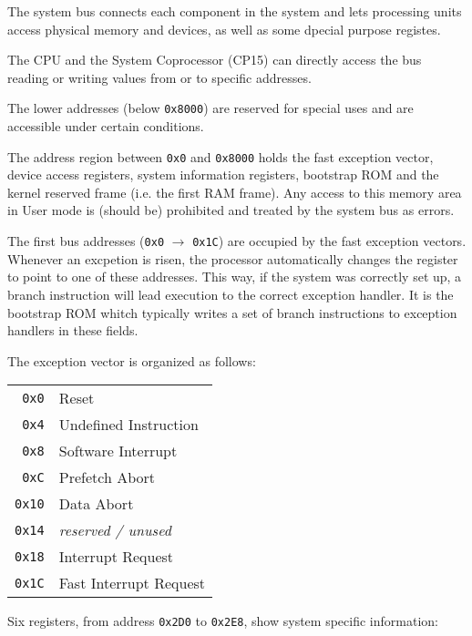 
The system bus connects each component in the system and lets processing units access physical memory and devices, as well as some dpecial purpose registes.

The CPU and the System Coprocessor (CP15) can directly access the bus reading or writing values from or to specific addresses.

The lower addresses (below \texttt{0x8000}) are reserved for special uses and are accessible under certain conditions.

The address region between \texttt{0x0} and \texttt{0x8000} holds the fast exception vector, device access registers, system information registers, bootstrap ROM and the kernel reserved frame (i.e. the first RAM frame). Any access to this memory area in User mode is (should be) prohibited and treated by the system bus as errors.

\label{sec:man:exceptionVector}
The first bus addresses (\texttt{0x0} $\rightarrow$ \texttt{0x1C}) are occupied by the fast exception vectors.
Whenever an excpetion is risen, the processor automatically changes the  register to point to one of these addresses. 
This way, if the system was correctly set up, a branch instruction will lead execution to the correct exception handler.
It is the bootstrap ROM whitch typically writes a set of branch instructions to exception handlers in these fields.

The exception vector is organized as follows:
\\

\begin{tabular}{r|l}
\texttt{0x0} & Reset \\
\texttt{0x4} & Undefined Instruction \\
\texttt{0x8} & Software Interrupt \\
\texttt{0xC} & Prefetch Abort \\
\texttt{0x10} & Data Abort \\
\texttt{0x14} & \emph{reserved / unused} \\
\texttt{0x18} & Interrupt Request \\
\texttt{0x1C} & Fast Interrupt Request \\
\end{tabular}


Six registers, from address \texttt{0x2D0} to \texttt{0x2E8}, show system specific information:
\\

